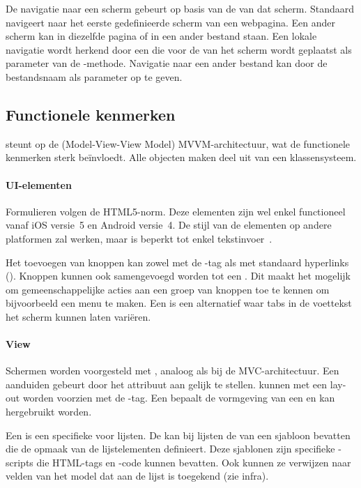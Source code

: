 De navigatie naar een scherm gebeurt op basis van de  van dat scherm.
Standaard navigeert \kendo{} naar het eerste gedefinieerde scherm van een webpagina.
Een ander scherm kan in diezelfde pagina of in een ander bestand staan.
Een lokale navigatie wordt herkend door een  die voor de  van het scherm wordt geplaatst als parameter van de -methode.
Navigatie naar een ander bestand kan door de bestandsnaam als parameter op te geven.

\subsection{Functionele kenmerken}
\label{sec:kendo-functioneel}
\kendo{} steunt op de (Model-View-View Model) MVVM-architectuur,  wat de functionele kenmerken sterk beïnvloedt.
Alle objecten maken deel uit van een klassensysteem.

\paragraph{UI-elementen}
Formulieren volgen de HTML5-norm. 
Deze elementen zijn wel enkel functioneel vanaf iOS versie~5 en Android versie~4.  
De stijl van de elementen op andere platformen zal werken, maar is beperkt tot enkel tekstinvoer~\cite{Telerike}.

Het toevoegen van knoppen kan zowel met de -tag als met standaard hyperlinks ().
Knoppen kunnen ook samengevoegd worden tot een .
Dit maakt het mogelijk om gemeenschappelijke acties aan een groep van knoppen toe te kennen om bijvoorbeeld een menu te maken.
Een  is een alternatief waar tabs in de voettekst het scherm kunnen laten variëren.

\paragraph{View}
Schermen worden voorgesteld met ,  analoog als bij de MVC-architectuur.
Een  aanduiden gebeurt door het attribuut  aan  gelijk te stellen.
 kunnen met een lay-out worden voorzien met de -tag.
Een  bepaalt de vormgeving van een  en kan hergebruikt worden.

Een  is een specifieke  voor lijsten.
De  kan bij lijsten de  van een sjabloon bevatten die de opmaak van de lijstelementen definieert.
Deze sjablonen zijn specifieke \kendo{}-scripts die HTML-tags en \js{}-code kunnen bevatten.
Ook kunnen ze verwijzen naar velden van het model dat aan de lijst is toegekend (zie infra).

